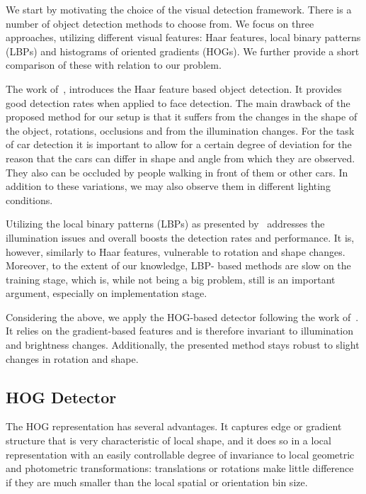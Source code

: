 We start by motivating the choice of the visual detection framework. There is
a number of object detection methods to choose from. We focus on three
approaches, utilizing different visual features: Haar features, local binary
patterns (LBPs) and histograms of oriented gradients (HOGs). We further
provide a short comparison of these with relation to our problem.

The work of~\citet{violajones2001}, introduces the Haar feature based object
detection. It provides good detection rates when applied to face detection.
The main drawback of the proposed method for our setup is that it suffers from
the changes in the shape of the object, rotations, occlusions and from the
illumination changes. For the task of car detection it is important to allow
for a certain degree of deviation for the reason that the cars can differ in
shape and angle from which they are observed. They also can be occluded by
people walking in front of them or other cars. In addition to these
variations, we may also observe them in different lighting conditions.

Utilizing the local binary patterns (LBPs) as presented by~\citet{lbp2010}
addresses the illumination issues and overall boosts the detection rates and
performance. It is, however, similarly to Haar features, vulnerable to
rotation and shape changes. Moreover, to the extent of our knowledge, LBP-
based methods are slow on the training stage, which is, while not being a big
problem, still is an important argument, especially on implementation stage.

Considering the above, we apply the HOG-based detector following the work
of~\citet{dalal2005}. It relies on the gradient-based features and is
therefore invariant to illumination and brightness changes. Additionally, the
presented method stays robust to slight changes in rotation and shape.

\subsection{HOG Detector}\label{sub:hog_detector}

The HOG representation has several advantages. It captures edge or
gradient structure that is very characteristic of local shape, and it does
so in a local representation with an easily controllable degree of
invariance to local geometric and photometric transformations:
translations or rotations make little difference if they are much smaller
than the local spatial or orientation bin size.

